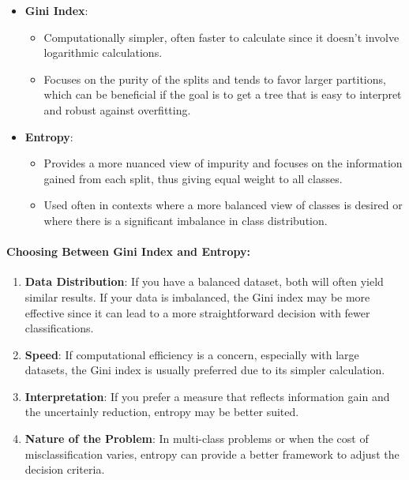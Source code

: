 \documentclass[12pt]{book}
\providecommand{\tightlist}{%
  \setlength{\itemsep}{0pt}\setlength{\parskip}{0pt}}
\begin{document}
\begin{itemize}
\tightlist
\item
  \textbf{Gini Index}:

  \begin{itemize}
  \tightlist
  \item
    Computationally simpler, often faster to calculate since it doesn't
    involve logarithmic calculations.
  \item
    Focuses on the purity of the splits and tends to favor larger
    partitions, which can be beneficial if the goal is to get a tree
    that is easy to interpret and robust against overfitting.
  \end{itemize}
\item
  \textbf{Entropy}:

  \begin{itemize}
  \tightlist
  \item
    Provides a more nuanced view of impurity and focuses on the
    information gained from each split, thus giving equal weight to all
    classes.
  \item
    Used often in contexts where a more balanced view of classes is
    desired or where there is a significant imbalance in class
    distribution.
  \end{itemize}
\end{itemize}

\paragraph{Choosing Between Gini Index and
Entropy:}\label{choosing-between-gini-index-and-entropy}

\begin{enumerate}
\def\labelenumi{\arabic{enumi}.}
\item
  \textbf{Data Distribution}: If you have a balanced dataset, both will
  often yield similar results. If your data is imbalanced, the Gini
  index may be more effective since it can lead to a more
  straightforward decision with fewer classifications.
\item
  \textbf{Speed}: If computational efficiency is a concern, especially
  with large datasets, the Gini index is usually preferred due to its
  simpler calculation.
\item
  \textbf{Interpretation}: If you prefer a measure that reflects
  information gain and the uncertainly reduction, entropy may be better
  suited.
\item
  \textbf{Nature of the Problem}: In multi-class problems or when the
  cost of misclassification varies, entropy can provide a better
  framework to adjust the decision criteria.
\end{enumerate}
\end{document}
